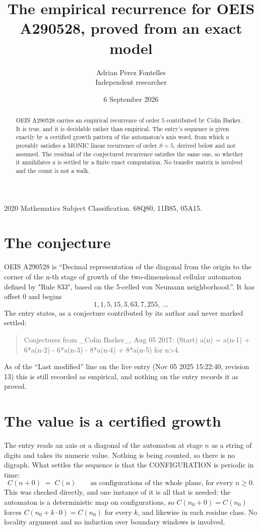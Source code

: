 \documentclass[11pt,a4paper]{article}
\title{The empirical recurrence for OEIS A290528, proved from an exact model}
\author{Adrian Perez Fontelles\\ \small Independent researcher}
\date{6 September 2026}
\theoremstyle{plain}
\theoremstyle{definition}
\begin{document}
\maketitle

\begin{abstract}
OEIS A290528 carries an empirical recurrence of order $5$ contributed by Colin Barker. It is true, and it is
decidable rather than empirical. The entry's sequence is given exactly by a certified growth pattern of the automaton's axis word, from
which $a$ provably satisfies a MONIC linear recurrence of order $S=5$, derived below and not
assumed. The residual of the conjectured recurrence satisfies the same one, so whether it
annihilates $a$ is settled by a finite exact computation. No transfer matrix is involved and
the count is not a walk.
\end{abstract}

\noindent\small 2020 Mathematics Subject Classification. 68Q80, 11B85, 05A15.\normalsize

\section{The conjecture}

OEIS A290528 is ``Decimal representation of the diagonal from the origin to the corner of the n-th stage of growth of the two-dimensional cellular automaton defined by "Rule 833", based on the 5-celled von Neumann neighborhood.''. It has offset $0$ and begins
\[
1, 1, 5, 15, 3, 63, 7, 255,\ \dots
\]
The entry states, as a conjecture contributed by its author and never marked settled:
\begin{quote}
Conjectures from \_Colin Barker\_, Aug 05 2017: (Start) a(n) = a(n-1) + 6*a(n-2) - 6*a(n-3) - 8*a(n-4) + 8*a(n-5) for n>4.
\end{quote}
As of the ``Last modified'' line on the live entry (Nov 05 2025 15:22:40, revision 13)
this is still recorded as empirical, and nothing on the entry records it as proved.

\section{The value is a certified growth}

The entry reads an axis or a diagonal of the automaton at stage $n$ as a string of digits and
takes its numeric value. Nothing is being counted, so there is no digraph. What settles the
sequence is that the CONFIGURATION is periodic in time:
\[
C(n+0)\;=\;C(n)\qquad\text{as configurations of the whole plane, for every } n\ge 0.
\]
This was checked directly, and one instance of it is all that is needed: the automaton is a
deterministic map on configurations, so $C(n_0+0)=C(n_0)$ forces $C(n_0+k\cdot0)=C(n_0)$ for
every $k$, and likewise in each residue class. No locality argument and no induction over
boundary windows is involved.
\end{document}
